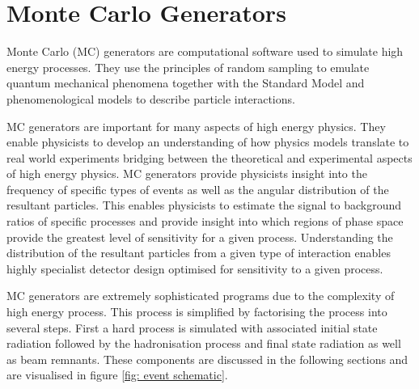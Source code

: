 \section{Monte Carlo Generators}
\label{section: mc generators}

Monte Carlo (MC) generators are computational software used to simulate high energy processes. They use the principles of random sampling to emulate quantum mechanical phenomena together with the Standard Model and phenomenological models to describe particle interactions. %


MC generators are important for many aspects of high energy physics. They enable physicists to develop an understanding of how physics models translate to real world experiments bridging between the theoretical and experimental aspects of high energy physics. MC generators provide physicists insight into the frequency of specific types of events as well as the angular distribution of the resultant particles. This enables physicists to estimate the signal to background ratios of specific processes and provide insight into which regions of phase space provide the greatest level of sensitivity for a given process. Understanding the distribution of the resultant particles from a given type of interaction enables highly specialist detector design optimised for sensitivity to a given process.

MC generators are extremely sophisticated programs due to the complexity of high energy process. This process is simplified by factorising the process into several steps. First a hard process is simulated with associated initial state radiation followed by the hadronisation process and final state radiation as well as beam remnants. These components are discussed in the following sections and are visualised in figure \ref{fig: event schematic}.

